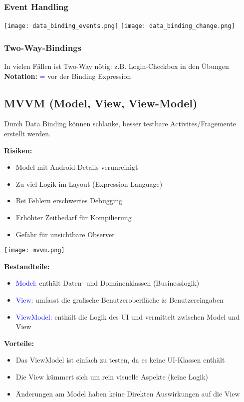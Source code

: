 \subsubsection{Event Handling}
\texttt{[image: data\_binding\_events.png]}
\texttt{[image: data\_binding\_change.png]}
\subsubsection{Two-Way-Bindings}
In vielen Fällen ist Two-Way nötig: z.B. Login-Checkbox in den Übungen\\
\textbf{Notation:} \textcolor{blue}{=} vor der Binding Expression

\subsection{MVVM (Model, View, View-Model)}
Durch Data Binding können schlanke, besser testbare Activites/Fragemente erstellt werden.\\
\begin{minipage}{0.6\linewidth}
    \textbf{Risiken:}
    \begin{itemize}[topsep=0pt, leftmargin=4mm]
        \setlength\itemsep{-0.3em}
        \item Model mit Android-Details verunreinigt
        \item Zu viel Logik im Layout (Expression Language)
        \item Bei Fehlern erschwertes Debugging
        \item Erhöhter Zeitbedarf für Kompilierung
        \item Gefahr für \dq unsichtbare Observer\dq
    \end{itemize}
\end{minipage}
\begin{minipage}{0.4\linewidth}
    \texttt{[image: mvvm.png]}
\end{minipage}
\textbf{Bestandteile:}
\begin{itemize}[topsep=0pt, leftmargin=4mm]
    \setlength\itemsep{-0.3em}
    \item \textcolor{blue}{Model:} enthält Daten- und Domänenklassen (Businesslogik)
    \item \textcolor{blue}{View:} umfasst die grafische Benutzeroberfläche \& Benutzereingaben
    \item \textcolor{blue}{ViewModel:} enthält die Logik des UI und vermittelt zwischen Model und View
\end{itemize}
\textbf{Vorteile:}
\begin{itemize}[topsep=0pt, leftmargin=4mm]
    \setlength\itemsep{-0.3em}
    \item Das ViewModel ist einfach zu testen, da es keine UI-Klassen enthält
    \item Die View kümmert sich um rein visuelle Aspekte (keine Logik)
    \item Änderungen am Model haben keine Direkten Auswirkungen auf die View
\end{itemize}
